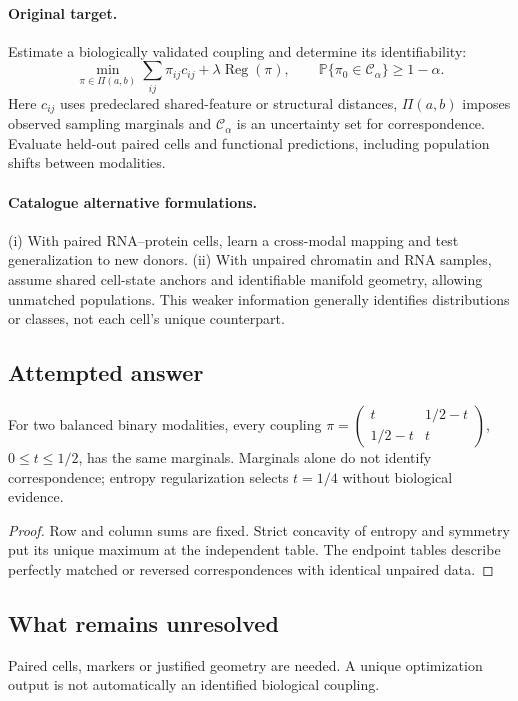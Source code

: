 \documentclass[11pt]{article}
\begin{document}
\paragraph{Original target.}
Estimate a biologically validated coupling and determine its identifiability:
\[\min_{\pi\in\Pi(a,b)}\sum_{ij}\pi_{ij}c_{ij}+\lambda\operatorname{Reg}(\pi),\qquad \mathbb{P}\{\pi_0\in\mathcal C_\alpha\}\ge1-\alpha.\]
Here $c_{ij}$ uses predeclared shared-feature or structural distances, $\Pi(a,b)$ imposes observed sampling marginals and $\mathcal C_\alpha$ is an uncertainty set for correspondence. Evaluate held-out paired cells and functional predictions, including population shifts between modalities.
\paragraph{Catalogue alternative formulations.}
(i) With paired RNA--protein cells, learn a cross-modal mapping and test generalization to new donors. (ii) With unpaired chromatin and RNA samples, assume shared cell-state anchors and identifiable manifold geometry, allowing unmatched populations. This weaker information generally identifies distributions or classes, not each cell's unique counterpart.
\subsection{Attempted answer}
\begin{proposition}
For two balanced binary modalities, every coupling $\pi=\left(\begin{smallmatrix}t&1/2-t\\1/2-t&t\end{smallmatrix}\right)$, $0\leq t\leq1/2$, has the same marginals. Marginals alone do not identify correspondence; entropy regularization selects $t=1/4$ without biological evidence.
\end{proposition}
\begin{proof}
Row and column sums are fixed. Strict concavity of entropy and symmetry put its unique maximum at the independent table. The endpoint tables describe perfectly matched or reversed correspondences with identical unpaired data.
\end{proof}
\subsection{What remains unresolved}
Paired cells, markers or justified geometry are needed. A unique optimization output is not automatically an identified biological coupling.
\end{document}
